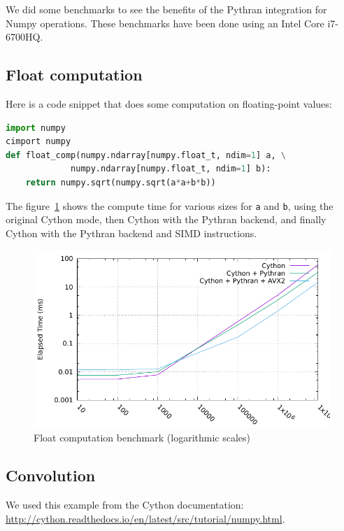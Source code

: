 \documentclass{deliverablereport}
\begin{document}
We did some benchmarks to see the benefits of the Pythran integration for Numpy
operations. These benchmarks have been done using an Intel Core i7-6700HQ.

\subsection{Float computation}

Here is a code snippet that does some computation on floating-point values:

\begin{lstlisting}[language=python]
import numpy
cimport numpy
def float_comp(numpy.ndarray[numpy.float_t, ndim=1] a, \
             numpy.ndarray[numpy.float_t, ndim=1] b):
    return numpy.sqrt(numpy.sqrt(a*a+b*b))
\end{lstlisting}

The figure~\ref{fig:float_bench} shows the compute time for various sizes for
{\tt a} and {\tt b}, using the original Cython mode, then Cython with the
Pythran backend, and finally Cython with the Pythran backend and SIMD
instructions.

\begin{figure}[h]
  \caption{\label{fig:float_bench} Float computation benchmark (logarithmic scales)}
  \includegraphics{benchs/float/graph.pdf}
\end{figure}

\subsection{Convolution}

We used this example from the Cython documentation:
\url{http://cython.readthedocs.io/en/latest/src/tutorial/numpy.html}.
\end{document}
